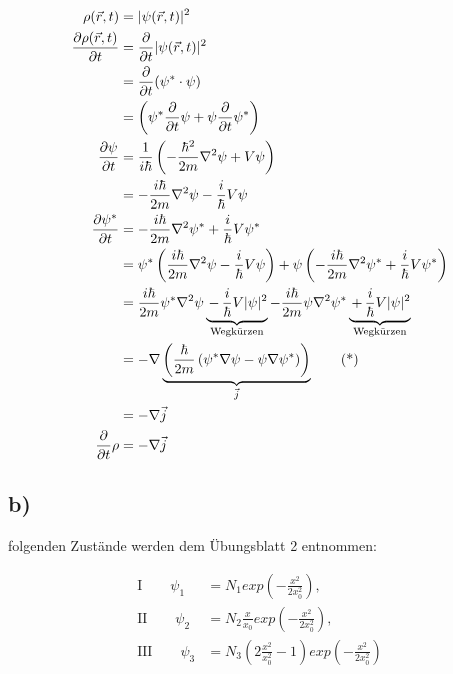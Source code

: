     \begin{align*}
        \rho(\vec{r},t) &= \lvert\psi(\vec{r},t)\rvert^2\\
        \frac{\partial\rho(\vec{r},t)}{\partial t} &= \frac{\partial}{\partial t} \lvert\psi(\vec{r},t)\rvert^2\\
        &= \frac{\partial}{\partial t} (\psi^* \cdot \psi)\\
        &= \left( \psi^* \frac{\partial}{\partial t} \psi + \psi \frac{\partial}{\partial t} \psi^* \right)\\
        \frac{\partial \psi}{\partial t} &= \frac{1}{i\hbar} \left( -\frac{\hbar^2}{2m} \nabla^2 \psi + V\psi \right)\\
        &= - \frac{i\hbar}{2m}\nabla^2 \psi - \frac{i}{\hbar} V \psi\\
        \frac{\partial \psi^*}{\partial t} &= -\frac{i\hbar}{2m} \nabla^2 \psi^* + \frac{i}{\hbar} V \psi^*\\
        &= \psi^* \left( \frac{i\hbar}{2m} \nabla^2 \psi - \frac{i}{\hbar} V \psi \right) + \psi \left( -\frac{i\hbar}{2m} \nabla^2 \psi^* + \frac{i}{\hbar} V \psi^* \right)\\
        &= \frac{i\hbar}{2m} \psi^* \nabla^2 \psi \underbrace{\,-\,\frac{i}{\hbar} V \lvert\psi\rvert^2}_{\text{Wegk\"urzen}} - \frac{i\hbar}{2m} \psi \nabla^2 \psi^* \underbrace{\,+\,\frac{i}{\hbar} V \lvert\psi\rvert^2}_{\text{Wegk\"urzen}}\\
        &= - \nabla \underbrace{\left( \frac{\hbar}{2m} \left( \psi^* \nabla \psi - \psi \nabla \psi^* \right) \right)}_{\vec{j}} \tag{*}\\
        &= - \nabla \vec{j}\\
        \frac{\partial}{\partial t}\rho &= -\nabla\vec{j} 
    \end{align*}

\newpage
\subsection{b)}

    \justifying folgenden Zustände werden dem Übungsblatt 2 entnommen:

    \noindent\makebox[\linewidth]{\rule{\textwidth}{1pt}}
    \begin{align*}
        \text{I} \qquad \psi_1 &= N_1 exp \left(-\frac{x^2}{2x_0^2} \right),\\
        \text{II} \qquad \psi_2 &= N_2 \frac{x}{x_0} exp \left( -\frac{x^2}{2x_0^2} \right),\\
        \text{III} \qquad \psi_3 &= N_3 \left( 2\frac{x^2}{x_0^2}-1 \right) exp \left( -\frac{x^2}{2x_0^2} \right)
    \end{align*}
    \noindent\makebox[\linewidth]{\rule{\textwidth}{1pt}}


